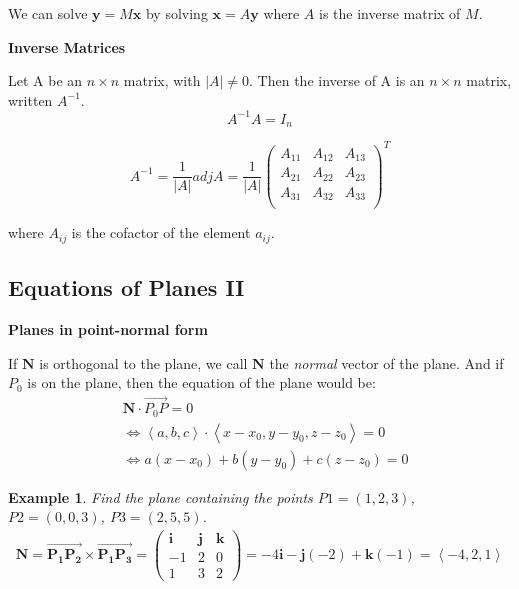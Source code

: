 \documentclass{article}
\newtheorem{exmp}{Example}
\newcommand\lrangle[1]{\left \langle #1 \right \rangle}
\newcommand\deter[1]{\left| #1 \right|}
\begin{document}
We can solve $\textbf{y} = M\textbf{x}$ by solving $\textbf{x} = A\textbf{y}$ where $A$ is the inverse matrix of $M$.

\textbf{Inverse Matrices}

Let A be an $n \times n$ matrix, with $\deter{A} \neq 0$. Then the inverse of A is an $n \times n$
matrix, written $A^{-1}$.
$$A^{-1}A = I_n$$

$$A^{-1} = \frac{1}{\deter{A}}adj A = \frac{1}{\deter{A}}
  \begin{pmatrix}
    A_{11} & A_{12} & A_{13} \\
    A_{21} & A_{22} & A_{23} \\
    A_{31} & A_{32} & A_{33} \\
  \end{pmatrix}^T
$$

where $A_{ij}$ is the cofactor of the element $a_{ij}$.

\subsection{Equations of Planes II}
\textbf{Planes in point-normal form}

If $\mathbf{N}$ is orthogonal to the plane, we call $\mathbf{N}$ the \textit{normal} vector of the plane.
And if $P_0$ is on the plane, then the equation of the plane would be:
\begin{align*}
   & \textbf{N} \cdot \overrightarrow{P_0P} = 0                                \\
   & \Leftrightarrow \lrangle{a, b, c} \cdot \lrangle{x-x_0, y-y_0, z-z_0} = 0 \\
   & \Leftrightarrow a(x−x_0) + b(y−y_0) + c(z−z_0) = 0
\end{align*}
\begin{exmp}
  Find the plane containing the points $P1 = (1, 2, 3)$, $P2 = (0, 0, 3)$, $P3 = (2, 5, 5)$.
  \begin{align*}
    \mathbf{N} = \overrightarrow{\mathbf{P_1P_2}} \times \overrightarrow{\mathbf{P_1P_3}}
    = \begin{pmatrix}
      \mathbf{i} & \mathbf{j} & \mathbf{k} \\
      -1         & 2          & 0          \\
      1          & 3          & 2
    \end{pmatrix}
    = −4\mathbf{i} − \mathbf{j}(−2) + \mathbf{k}(−1) = \lrangle{-4,2,1}
  \end{align*}
\end{exmp}
\end{document}
